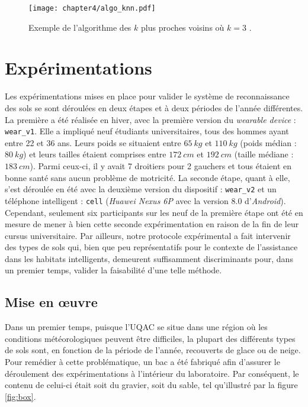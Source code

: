 \begin{figure}[H]
	\centering
	\texttt{[image: chapter4/algo\_knn.pdf]}
        \caption[Exemple de l'algorithme des $k$ plus proches voisins où $k=3$.]{Exemple de l'algorithme des $k$ plus proches voisins où $k=3$ \citep{Thullier2017}.}
	\label{fig:algo_knn}
\end{figure}

\section{Expérimentations}
\label{sec:expe}

Les expérimentations mises en place pour valider le système de reconnaissance des sols se sont déroulées en deux étapes et à deux périodes de l'année différentes. La première a été réalisée en hiver, avec la première version du \textit{wearable device} : \texttt{wear\_v1}. Elle a impliqué neuf étudiants universitaires, tous des hommes ayant entre 22 et 36 ans. Leurs poids se situaient entre $65\:kg$ et $110\:kg$ (poids médian : $80\:kg$) et leurs tailles étaient comprises entre $172\:cm$ et $192\:cm$ (taille médiane : $183\:cm$). Parmi ceux-ci, il y avait 7 droitiers pour 2 gauchers et tous étaient en bonne santé sans aucun problème de motricité. La seconde étape, quant à elle, s'est déroulée en été avec la deuxième version du dispositif : \texttt{wear\_v2} et un téléphone intelligent : \texttt{cell} (\textit{Huawei Nexus 6P} avec la version $8.0$ d'\textit{Android}). Cependant, seulement six participants sur les neuf de la première étape ont été en mesure de mener à bien cette seconde expérimentation en raison de la fin de leur cursus universitaire. Par ailleurs, notre protocole expérimental a fait intervenir des types de sols qui, bien que peu représentatifs pour le contexte de l'assistance dans les habitats intelligents, demeurent suffisamment discriminants pour, dans un premier temps, valider la faisabilité d'une telle méthode.

\subsection{Mise en \oe{}uvre}

Dans un premier temps, puisque l'\acs{UQAC} se situe dans une région où les conditions météorologiques peuvent être difficiles, la plupart des différents types de sols sont, en fonction de la période de l'année, recouverts de glace ou de neige. Pour remédier à cette problématique, un bac a été fabriqué afin d'assurer le déroulement des expérimentations à l'intérieur du laboratoire. Par conséquent, le contenu de celui-ci était soit du gravier, soit du sable, tel qu'illustré par la figure \ref{fig:box}.

